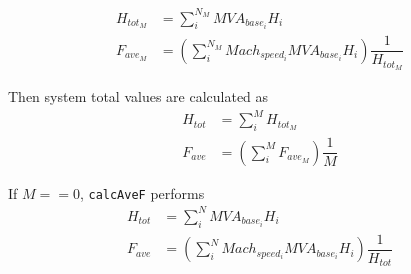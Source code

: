 \begin{align*}
%             
%         
H_{tot_M} &= \sum_{i}^{N_M} MVA_{base_i}H_i \\
F_{ave_M} &= \left( \sum_{i}^{N_M}Mach_{speed_i}MVA_{base_i}H_i \right) \dfrac{1}{H_{tot_M}}
\end{align*}

Then system total values are calculated as
\begin{align*}
H_{tot} &= \sum_{i}^{M} H_{tot_M} \\
F_{ave} &= \left( \sum_{i}^{M} F_{ave_M} \right) \dfrac{1}{M}
\end{align*}

If $M==0$, \verb|calcAveF| performs
\begin{align*}
H_{tot} &= \sum_{i}^{N} MVA_{base_i}H_i \\
F_{ave} &= \left( \sum_{i}^{N}Mach_{speed_i}MVA_{base_i}H_i \right) \dfrac{1}{H_{tot}}
\end{align*}

